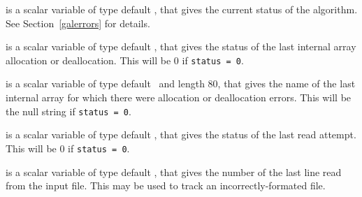 \documentclass{galahad}
\begin{document}
\begin{description}
 is a scalar variable of type default \integer, that gives the
current status of the algorithm. See Section~\ref{galerrors} for details.

 is a scalar variable of type default \integer,
that gives the status of the last internal array allocation
or deallocation. This will be 0 if {\tt status = 0}.

 is a scalar variable of type default \character\
and length 80, that  gives the name of the last internal array
for which there were allocation or deallocation errors.
This will be the null string if {\tt status = 0}.

 is a scalar variable of type default \integer,
that gives the status of the last read attempt.
This will be 0 if {\tt status = 0}.

 is a scalar variable of type default \integer,
that gives the number of the last line read from the input file.
This may be used to track an incorrectly-formated file.


\end{description}
\end{document}
